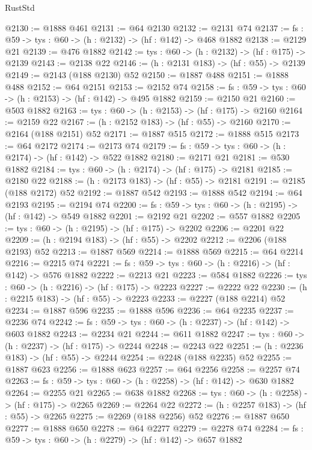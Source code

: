 \begin{lexlean}{RustStd}
\begin{coremodule}
@2130 := @1888 @461
@2131 := @64 @2130
@2132 := @2131 @74
@2137 := {fs : @59} -> {tys : @60} -> (h : @2132) -> (hf : @142) -> @468 @1882
@2138 := @2129 @21
@2139 := @476 @1882
@2142 := {tys : @60} -> (h : @2132) -> (hf : @175) -> @2139
@2143 := @2138 @22
@2146 := (h : @2131 @183) -> (hf : @55) -> @2139
@2149 := @2143 (@188 @2130) @52
@2150 := @1887 @488
@2151 := @1888 @488
@2152 := @64 @2151
@2153 := @2152 @74
@2158 := {fs : @59} -> {tys : @60} -> (h : @2153) -> (hf : @142) -> @495 @1882
@2159 := @2150 @21
@2160 := @503 @1882
@2163 := {tys : @60} -> (h : @2153) -> (hf : @175) -> @2160
@2164 := @2159 @22
@2167 := (h : @2152 @183) -> (hf : @55) -> @2160
@2170 := @2164 (@188 @2151) @52
@2171 := @1887 @515
@2172 := @1888 @515
@2173 := @64 @2172
@2174 := @2173 @74
@2179 := {fs : @59} -> {tys : @60} -> (h : @2174) -> (hf : @142) -> @522 @1882
@2180 := @2171 @21
@2181 := @530 @1882
@2184 := {tys : @60} -> (h : @2174) -> (hf : @175) -> @2181
@2185 := @2180 @22
@2188 := (h : @2173 @183) -> (hf : @55) -> @2181
@2191 := @2185 (@188 @2172) @52
@2192 := @1887 @542
@2193 := @1888 @542
@2194 := @64 @2193
@2195 := @2194 @74
@2200 := {fs : @59} -> {tys : @60} -> (h : @2195) -> (hf : @142) -> @549 @1882
@2201 := @2192 @21
@2202 := @557 @1882
@2205 := {tys : @60} -> (h : @2195) -> (hf : @175) -> @2202
@2206 := @2201 @22
@2209 := (h : @2194 @183) -> (hf : @55) -> @2202
@2212 := @2206 (@188 @2193) @52
@2213 := @1887 @569
@2214 := @1888 @569
@2215 := @64 @2214
@2216 := @2215 @74
@2221 := {fs : @59} -> {tys : @60} -> (h : @2216) -> (hf : @142) -> @576 @1882
@2222 := @2213 @21
@2223 := @584 @1882
@2226 := {tys : @60} -> (h : @2216) -> (hf : @175) -> @2223
@2227 := @2222 @22
@2230 := (h : @2215 @183) -> (hf : @55) -> @2223
@2233 := @2227 (@188 @2214) @52
@2234 := @1887 @596
@2235 := @1888 @596
@2236 := @64 @2235
@2237 := @2236 @74
@2242 := {fs : @59} -> {tys : @60} -> (h : @2237) -> (hf : @142) -> @603 @1882
@2243 := @2234 @21
@2244 := @611 @1882
@2247 := {tys : @60} -> (h : @2237) -> (hf : @175) -> @2244
@2248 := @2243 @22
@2251 := (h : @2236 @183) -> (hf : @55) -> @2244
@2254 := @2248 (@188 @2235) @52
@2255 := @1887 @623
@2256 := @1888 @623
@2257 := @64 @2256
@2258 := @2257 @74
@2263 := {fs : @59} -> {tys : @60} -> (h : @2258) -> (hf : @142) -> @630 @1882
@2264 := @2255 @21
@2265 := @638 @1882
@2268 := {tys : @60} -> (h : @2258) -> (hf : @175) -> @2265
@2269 := @2264 @22
@2272 := (h : @2257 @183) -> (hf : @55) -> @2265
@2275 := @2269 (@188 @2256) @52
@2276 := @1887 @650
@2277 := @1888 @650
@2278 := @64 @2277
@2279 := @2278 @74
@2284 := {fs : @59} -> {tys : @60} -> (h : @2279) -> (hf : @142) -> @657 @1882

\end{coremodule}
\end{lexlean}
